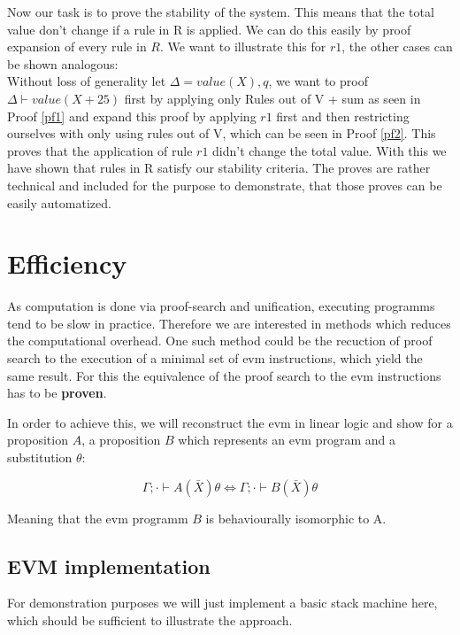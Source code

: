 \documentclass[sigconf]{acmart}
\begin{document}
Now our task is to prove the stability of the system. This means that the total value don't change if a rule in R is applied. We can do this easily by proof expansion of every rule in $R$.
We want to illustrate this for $r1$, the other cases can be shown analogous:
\\
Without loss of generality let $\Delta = value(X), q$, we want to proof $\Delta \vdash value(X + 25)$ first by applying only Rules out of V + sum as seen in Proof \ref{pf1} and expand this proof by applying $r1$ first and then restricting ourselves with only using rules out of V, which can be seen in Proof \ref{pf2}. This proves that the application of rule $r1$ didn't change the total value.
With this we have shown that rules in R satisfy our stability criteria.
The proves are rather technical and included for the purpose to demonstrate, that those proves can be easily automatized.

\section{Efficiency}
As computation is done via proof-search and unification, executing programms tend to be slow in practice. Therefore we are interested in methods which reduces the computational overhead. One such method could be the recuction of proof search to the execution of a minimal set of evm instructions, which yield the same result. For this the equivalence of the proof search to the evm instructions has to be \textbf{proven}.

In order to achieve this, we will reconstruct the evm in linear logic and show for a proposition $A$, a proposition $B$ which represents an evm program and a substitution $\theta$:

\[ \Gamma; \cdot \vdash A(\bar X)\theta \Leftrightarrow \Gamma; \cdot \vdash B(\bar X)\theta \]


Meaning that the evm programm $B$ is behaviourally isomorphic to A.

\subsection*{EVM implementation}
For demonstration purposes we will just implement a basic stack machine here, which should be sufficient to illustrate the approach.
\end{document}
